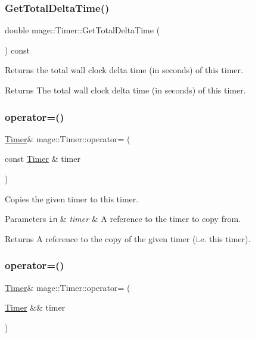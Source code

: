 \subsubsection{\texorpdfstring{Get\+Total\+Delta\+Time()}{GetTotalDeltaTime()}}
{\footnotesize\ttfamily double mage\+::\+Timer\+::\+Get\+Total\+Delta\+Time (\begin{DoxyParamCaption}{ }\end{DoxyParamCaption}) const}

Returns the total wall clock delta time (in seconds) of this timer.

\begin{DoxyReturn}{Returns}
The total wall clock delta time (in seconds) of this timer. 
\end{DoxyReturn}
\hypertarget{classmage_1_1_timer_ae83df63d5ff9eec370eddf208ac2077e}{}\label{classmage_1_1_timer_ae83df63d5ff9eec370eddf208ac2077e} 
\subsubsection{\texorpdfstring{operator=()}{operator=()}\hspace{0.1cm}{\footnotesize\ttfamily [1/2]}}
{\footnotesize\ttfamily \hyperlink{classmage_1_1_timer}{Timer}\& mage\+::\+Timer\+::operator= (\begin{DoxyParamCaption}\item[{const \hyperlink{classmage_1_1_timer}{Timer} \&}]{timer }\end{DoxyParamCaption})\hspace{0.3cm}{\ttfamily [default]}}

Copies the given timer to this timer.


\begin{DoxyParams}[1]{Parameters}
\mbox{\tt in}  & {\em timer} & A reference to the timer to copy from. \\
\hline
\end{DoxyParams}
\begin{DoxyReturn}{Returns}
A reference to the copy of the given timer (i.\+e. this timer). 
\end{DoxyReturn}
\hypertarget{classmage_1_1_timer_a93f3a9d730bebd189af904568e5b7ecd}{}\label{classmage_1_1_timer_a93f3a9d730bebd189af904568e5b7ecd} 
\subsubsection{\texorpdfstring{operator=()}{operator=()}\hspace{0.1cm}{\footnotesize\ttfamily [2/2]}}
{\footnotesize\ttfamily \hyperlink{classmage_1_1_timer}{Timer}\& mage\+::\+Timer\+::operator= (\begin{DoxyParamCaption}\item[{\hyperlink{classmage_1_1_timer}{Timer} \&\&}]{timer }\end{DoxyParamCaption})\hspace{0.3cm}{\ttfamily [default]}}

